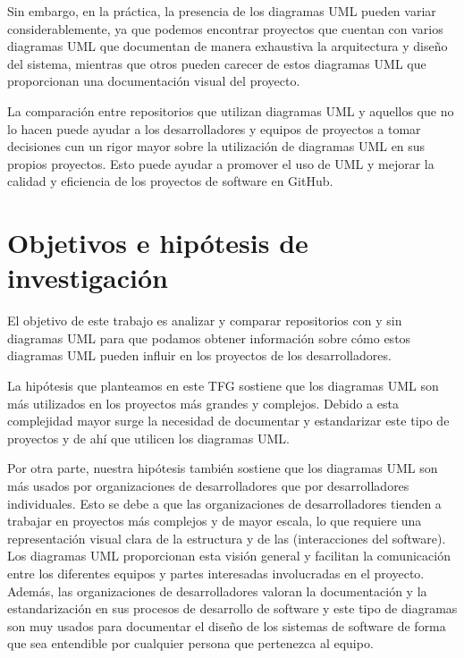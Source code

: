 \documentclass[a4paper, 12pt]{book}
\begin{document}
Sin embargo, en la práctica, la presencia de los diagramas UML pueden variar considerablemente, ya que podemos encontrar proyectos que cuentan con varios diagramas UML que documentan de manera exhaustiva la arquitectura y diseño del sistema, mientras que otros pueden carecer de estos diagramas UML que proporcionan una documentación visual del proyecto.

La comparación entre repositorios que utilizan diagramas UML y aquellos que no lo hacen puede ayudar a los desarrolladores y equipos de proyectos a tomar decisiones cun un rigor mayor sobre la utilización de diagramas UML en sus propios proyectos.
Esto puede ayudar a promover el uso de UML y mejorar la calidad y eficiencia de los proyectos de software en GitHub.


\section{Objetivos e hipótesis de investigación} %
\label{sec:bbjetivos e hipótesis de investigación} %


El objetivo de este trabajo es analizar y comparar repositorios con y sin diagramas UML para que podamos obtener información sobre cómo estos diagramas UML pueden influir en los proyectos de los desarrolladores. 


La hipótesis que planteamos en este TFG sostiene que los diagramas UML son más utilizados en los proyectos más grandes y complejos.
Debido a esta complejidad mayor surge la necesidad de documentar y estandarizar este tipo de proyectos y de ahí que utilicen los diagramas UML.


Por otra parte, nuestra hipótesis también sostiene que los diagramas UML son más usados por organizaciones de desarrolladores que por desarrolladores individuales.
Esto se debe a que las organizaciones de desarrolladores tienden a trabajar en proyectos más complejos y de mayor escala, lo que requiere una representación visual clara de la estructura y de las (interacciones del software).
Los diagramas UML proporcionan esta visión general y facilitan la comunicación entre los diferentes equipos y partes interesadas involucradas en el proyecto.
Además, las organizaciones de desarrolladores valoran la documentación y la estandarización en sus procesos de desarrollo de software y este tipo de diagramas son muy usados para documentar el diseño de los sistemas de software de forma que sea entendible por cualquier persona que pertenezca al equipo.
\end{document}
